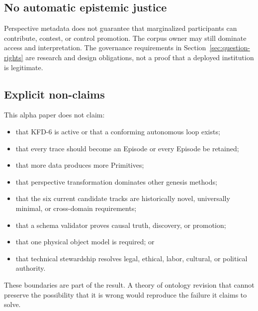\subsection{No automatic epistemic justice}

Perspective metadata does not guarantee that marginalized participants can
contribute, contest, or control promotion. The corpus owner may still dominate
access and interpretation. The governance requirements in
Section~\ref{sec:question-rights} are research and design obligations, not a
proof that a deployed institution is legitimate.

\subsection{Explicit non-claims}

This alpha paper does not claim:

\begin{itemize}[leftmargin=*]
  \item that KFD-6 is active or that a conforming autonomous loop exists;
  \item that every trace should become an Episode or every Episode be retained;
  \item that more data produces more Primitives;
  \item that perspective transformation dominates other genesis methods;
  \item that the six current candidate tracks are historically novel,
        universally minimal, or cross-domain requirements;
  \item that a schema validator proves causal truth, discovery, or promotion;
  \item that one physical object model is required; or
  \item that technical stewardship resolves legal, ethical, labor, cultural,
        or political authority.
\end{itemize}

These boundaries are part of the result. A theory of ontology revision that
cannot preserve the possibility that it is wrong would reproduce the failure
it claims to solve.

